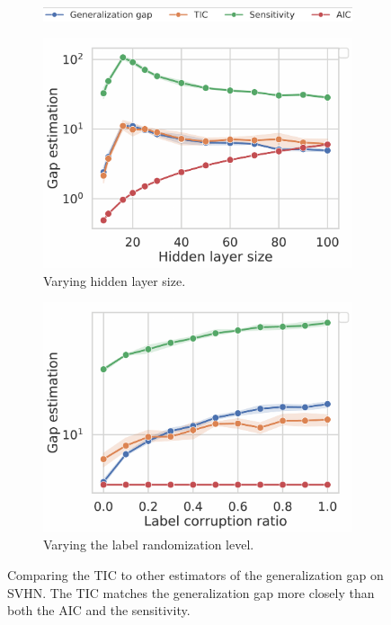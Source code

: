 \begin{figure}[ht]
 \centering
  \begin{subfigure}[b]{.92\textwidth}
    \includegraphics[trim={0 0 0 2mm},clip, width=\textwidth]{articles/hfc/legend_similarity.png}
  \end{subfigure}
  \centering
  \begin{subfigure}[b]{0.46\textwidth}
    \includegraphics[trim={0 0 8mm 0},clip,width=\textwidth]{articles/hfc/gap_hidden_size_no_lgd-2.pdf}
    \caption{Varying hidden layer size.}
    \label{fig:vary_h}
  \end{subfigure}
  \hfill
  \begin{subfigure}[b]{0.46\textwidth}
    \includegraphics[trim={0 0 8mm 0},clip,width=\textwidth]{articles/hfc/gap_corrupt_no_lgd-2.pdf}
    \caption{Varying the label randomization level.}
    \label{fig:vary_corr}
  \end{subfigure}
 
  \label{fig:neyshabur_exp}
\caption{Comparing the TIC to other estimators of the generalization gap on SVHN. The TIC matches the generalization gap more closely than both the AIC and the sensitivity.}
\end{figure}

